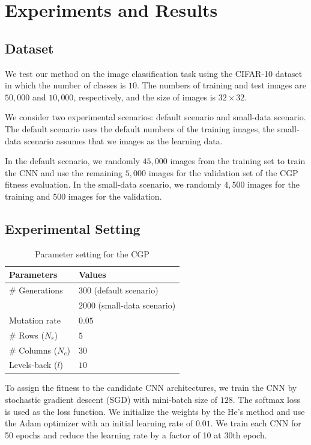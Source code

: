 \section{Experiments and Results}
\subsection{Dataset}
We test our method on the image classification task using the CIFAR-10 dataset in which the number of classes is $10$. The numbers of training and test images are $50,000$ and $10,000$, respectively, and the size of images is $32 \times 32$.

We consider two experimental scenarios:  default scenario and  small-data scenario.
The default scenario uses the default numbers of the training images,  the small-data scenario assumes that we  images as the learning data. 

In the default scenario, we randomly  $45,000$ images from the training set to train the CNN\new{,} and  use the remaining $5,000$ images for the validation set of the CGP fitness evaluation.
In the small-data scenario, we randomly  $4,500$ images for the training and $500$ images for the validation.

\subsection{Experimental Setting}

\begin{table}[t]
  \caption{Parameter setting for the CGP}
  \label{cgp_param}
  \begin{tabular}{l|l} \hline
    Parameters & Values \\ \hline
   \# Generations & $300$ (default scenario) \\ 
                          & $2000$ (small-data scenario) \\ 
   Mutation rate & $0.05$ \\
   \#  Rows ($N_r$) & $5$ \\
   \#  Columns ($N_c$) & $30$ \\
   Levels-back ($l$) & $10$ \\ \hline
  \end{tabular}
\end{table}


To assign the fitness to the candidate CNN architectures, we train the CNN by stochastic gradient descent (SGD) with  mini-batch size of $128$. The softmax  loss is used as the loss function.
We initialize the weights by the He's method \cite{he_delving_2015} and use the Adam optimizer \cite{kingma_adam:_2015} with an initial learning rate of $0.01$. 
We train each CNN for 50 epochs and reduce the learning rate by a factor of 10 at 30th epoch.

